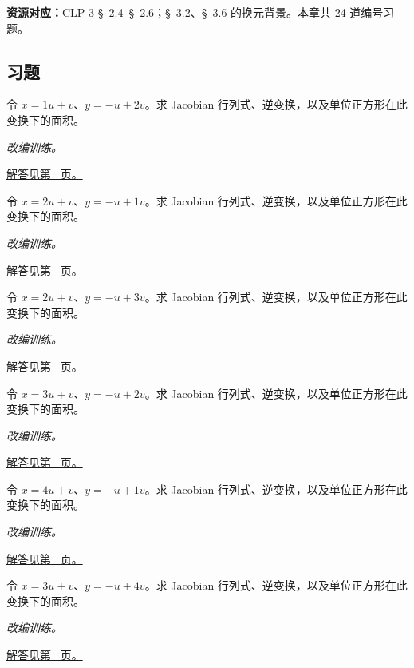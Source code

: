 \documentclass[12pt,fontset=fandol]{ctexart}
\begin{document}
\textbf{资源对应：}CLP-3 \S~2.4--\S~2.6；\S~3.2、\S~3.6 的换元背景。本章共 24 道编号习题。
\subsection{习题}
\begin{example}[线性换元的面积缩放]\label{ex:c33q1}
令 $x=1u+v$、$y=-u+2v$。求 Jacobian 行列式、逆变换，以及单位正方形在此变换下的面积。
\par\textit{改编训练。}\par\hyperref[ans:c33q1]{解答见第~\pageref{ans:c33q1} 页。}
\end{example}
\begin{example}[线性换元的面积缩放]\label{ex:c33q2}
令 $x=2u+v$、$y=-u+1v$。求 Jacobian 行列式、逆变换，以及单位正方形在此变换下的面积。
\par\textit{改编训练。}\par\hyperref[ans:c33q2]{解答见第~\pageref{ans:c33q2} 页。}
\end{example}
\begin{example}[线性换元的面积缩放]\label{ex:c33q3}
令 $x=2u+v$、$y=-u+3v$。求 Jacobian 行列式、逆变换，以及单位正方形在此变换下的面积。
\par\textit{改编训练。}\par\hyperref[ans:c33q3]{解答见第~\pageref{ans:c33q3} 页。}
\end{example}
\begin{example}[线性换元的面积缩放]\label{ex:c33q4}
令 $x=3u+v$、$y=-u+2v$。求 Jacobian 行列式、逆变换，以及单位正方形在此变换下的面积。
\par\textit{改编训练。}\par\hyperref[ans:c33q4]{解答见第~\pageref{ans:c33q4} 页。}
\end{example}
\begin{example}[线性换元的面积缩放]\label{ex:c33q5}
令 $x=4u+v$、$y=-u+1v$。求 Jacobian 行列式、逆变换，以及单位正方形在此变换下的面积。
\par\textit{改编训练。}\par\hyperref[ans:c33q5]{解答见第~\pageref{ans:c33q5} 页。}
\end{example}
\begin{example}[线性换元的面积缩放]\label{ex:c33q6}
令 $x=3u+v$、$y=-u+4v$。求 Jacobian 行列式、逆变换，以及单位正方形在此变换下的面积。
\par\textit{改编训练。}\par\hyperref[ans:c33q6]{解答见第~\pageref{ans:c33q6} 页。}
\end{example}
\end{document}
